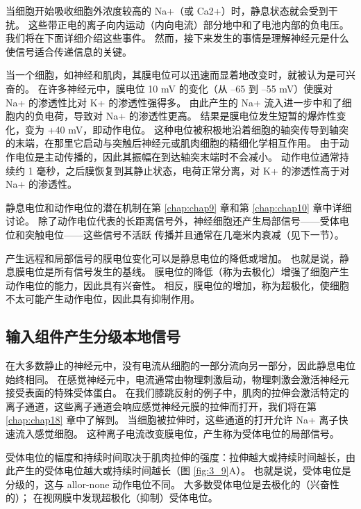 当细胞开始吸收细胞外浓度较高的 Na+（或 Ca2+）时，静息状态就会受到干扰。 
这些带正电的离子向内运动（内向电流）部分地中和了电池内部的负电压。 
我们将在下面详细介绍这些事件。 
然而，接下来发生的事情是理解神经元是什么使信号适合传递信息的关键。


当一个细胞，如神经和肌肉，其膜电位可以迅速而显着地改变时，就被认为是可兴奋的。 
在许多神经元中，膜电位 10 mV 的变化（从 –65 到 –55 mV）使膜对 Na+ 的渗透性比对 K+ 的渗透性强得多。 
由此产生的 Na+ 流入进一步中和了细胞内的负电荷，导致对 Na+ 的渗透性更高。 
结果是膜电位发生短暂的爆炸性变化，变为 +40 mV，即动作电位。 
这种电位被积极地沿着细胞的轴突传导到轴突的末端，在那里它启动与突触后神经元或肌肉细胞的精细化学相互作用。 
由于动作电位是主动传播的，因此其振幅在到达轴突末端时不会减小。 
动作电位通常持续约 1 毫秒，之后膜恢复到其静止状态，电荷正常分离，对 K+ 的渗透性高于对 Na+ 的渗透性。


静息电位和动作电位的潜在机制在第 \ref{chap:chap9} 章和第 \ref{chap:chap10} 章中详细讨论。
除了动作电位代表的长距离信号外，神经细胞还产生局部信号——受体电位和突触电位——这些信号不活跃 传播并且通常在几毫米内衰减（见下一节）。


产生远程和局部信号的膜电位变化可以是静息电位的降低或增加。 
也就是说，静息膜电位是所有信号发生的基线。 
膜电位的降低（称为去极化）增强了细胞产生动作电位的能力，因此具有兴奋性。 
相反，膜电位的增加，称为超极化，使细胞不太可能产生动作电位，因此具有抑制作用。


\subsection{输入组件产生分级本地信号}
在大多数静止的神经元中，没有电流从细胞的一部分流向另一部分，因此静息电位始终相同。 
在感觉神经元中，电流通常由物理刺激启动，物理刺激会激活神经元接受表面的特殊受体蛋白。 
在我们膝跳反射的例子中，肌肉的拉伸会激活特定的离子通道，这些离子通道会响应感觉神经元膜的拉伸而打开，我们将在第 \ref{chap:chap18} 章中了解到。
当细胞被拉伸时，这些通道的打开允许 Na+ 离子快速流入感觉细胞。 
这种离子电流改变膜电位，产生称为受体电位的局部信号。


受体电位的幅度和持续时间取决于肌肉拉伸的强度：拉伸越大或持续时间越长，由此产生的受体电位越大或持续时间越长（图 \ref{fig:3_9}A）。 
也就是说，受体电位是分级的，这与 allor-none 动作电位不同。 
大多数受体电位是去极化的（兴奋性的）； 在视网膜中发现超极化（抑制）受体电位。

